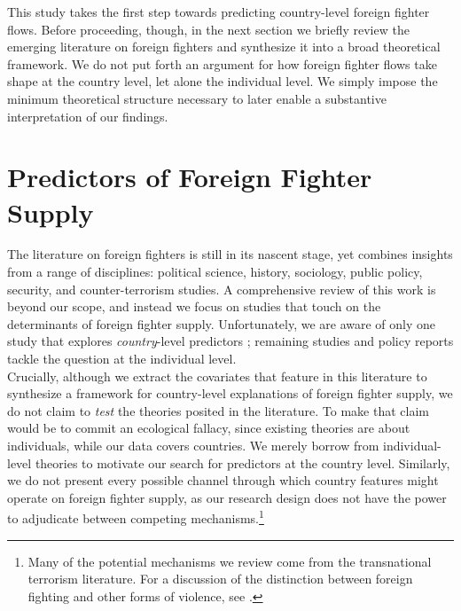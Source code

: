 \documentclass[12pt]{article}
\begin{document}
This study takes the first step towards predicting country-level foreign fighter flows. Before proceeding, though, in the next section we briefly review the emerging literature on foreign fighters and synthesize it into a broad theoretical framework. We do not put forth an argument for how foreign fighter flows take shape at the country level, let alone the individual level. We simply impose the minimum theoretical structure necessary to later enable a substantive interpretation of our findings. 

\section{Predictors of Foreign Fighter Supply}	\label{sec:theory}

The literature on foreign fighters is still in its nascent stage, yet combines insights from a range of disciplines: political science, history, sociology, public policy, security, and counter-terrorism studies. A comprehensive review of this work is beyond our scope, and instead we focus on studies that touch on the determinants of foreign fighter supply. Unfortunately, we are aware of only one study that explores \textit{country}-level predictors \citep{Hewitt2009}; remaining studies and policy reports tackle the question at the individual level.	\\ 

Crucially, although we extract the covariates that feature in this literature to synthesize a framework for country-level explanations of foreign fighter supply, we do not claim to \textit{test} the theories posited in the literature. To make that claim would be to commit an ecological fallacy, since existing theories are about individuals, while our data covers countries. We merely borrow from individual-level theories to motivate our search for predictors at the country level. Similarly, we do not present every possible channel through which country features might operate on foreign fighter supply, as our research design does not have the power to adjudicate between competing mechanisms.\footnote{Many of the potential mechanisms we review come from the transnational terrorism literature. For a discussion of the distinction between foreign fighting and other forms of violence, see \cite{Hegghammer2011}.}		\\
\end{document}
